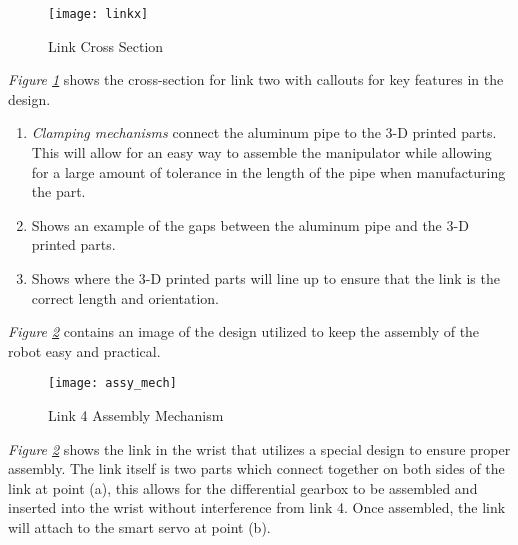 \begin{figure}[htp]
  \center
  \texttt{[image: linkx]}
  \caption{Link Cross Section}
  \label{fig:linkx}
\end{figure}

\emph{Figure \ref{fig:linkx}} shows the cross-section for link two with callouts for key features in the design.
\begin{enumerate}[label=\alph*.]
  \item \emph{Clamping mechanisms} connect the aluminum pipe to the 3-D printed parts. This will allow for an easy way to assemble the manipulator while allowing for a large amount of tolerance in the length of the pipe when manufacturing the part.
  \item Shows an example of the gaps between the aluminum pipe and the 3-D printed parts.
  \item Shows where the 3-D printed parts will line up to ensure that the link is the correct length and orientation.
\end{enumerate}
\emph{Figure \ref{fig:assy_mech}} contains an image of the design utilized to keep the assembly of the robot easy and practical.
\newpage

\begin{figure}[htp]
  \center
  \texttt{[image: assy\_mech]}
  \caption{Link 4 Assembly Mechanism}
  \label{fig:assy_mech}
\end{figure}

\emph{Figure \ref{fig:assy_mech}}  shows the link in the wrist that utilizes a special design to ensure proper assembly. The link itself is two parts which connect together on both sides of the link at point (a), this allows for the differential gearbox to be assembled and inserted into the wrist without interference from link 4. Once assembled, the link will attach to the smart servo at point (b).



